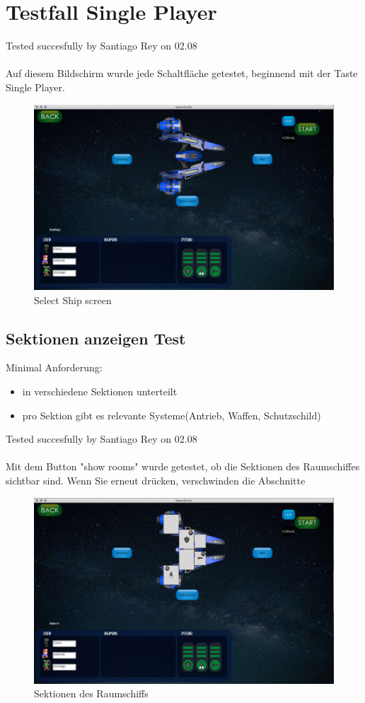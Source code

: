 \documentclass[12pt]{article}
\begin{document}
\section{Testfall Single Player}
Tested succesfully by Santiago Rey on 02.08\\\\
Auf diesem Bildschirm wurde jede Schaltfläche getestet, beginnend mit der Taste Single Player.\\
\begin{figure}[h]
\centering
\includegraphics[scale=0.4]{TestProtocolBilder/selecShipScreen.jpg}
\caption{Select Ship screen}
\end{figure}
\newpage
\subsection{Sektionen anzeigen Test}
Minimal Anforderung:
\begin{itemize}
\item in verschiedene Sektionen unterteilt
\item pro Sektion gibt es relevante Systeme(Antrieb, Waffen, Schutzschild)
\end{itemize}
Tested succesfully by Santiago Rey on 02.08\\\\
Mit dem Button "show rooms" wurde getestet, ob die Sektionen des Raumschiffes sichtbar sind. Wenn Sie erneut drücken, verschwinden die Abschnitte\\
\begin{figure}
\centering
\includegraphics[scale=0.4]{TestProtocolBilder/shipRooms.jpg}
\caption{Sektionen des Raumschiffs}
\end{figure}
\end{document}

